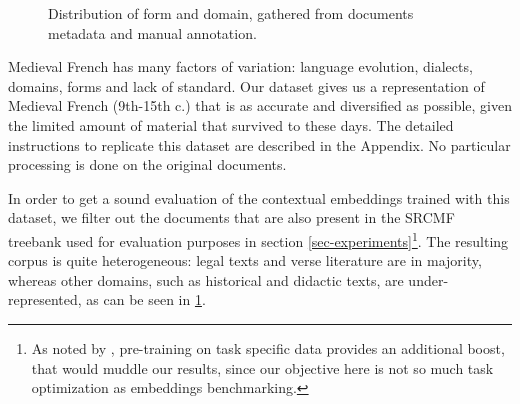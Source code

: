 \begin{figure}[thb]
    \centering
    \caption{Distribution of form and domain, gathered from documents metadata and manual annotation.}
    \label{fig:metadata}
\end{figure}

Medieval French has many factors of variation: language evolution, dialects, domains, forms and lack of standard. Our dataset gives us a representation of Medieval French (9th-15th c.) that is as accurate and diversified as possible, given the limited amount of material that survived to these days. The detailed instructions to replicate this dataset are described in the Appendix. No particular processing is done on the original documents.

In order to get a sound evaluation of the contextual embeddings trained with this dataset, we filter out the documents that are also present in the SRCMF treebank used for evaluation purposes in section \ref{sec-experiments}\footnote{As noted by \citet{gururangan-etal-2020-dont}, pre-training on task specific data provides an additional boost, that would muddle our results, since our objective here is not so much task optimization as embeddings benchmarking.}.
The resulting corpus is quite heterogeneous: legal texts and verse literature are in majority, whereas other domains, such as historical and didactic texts, are under-represented, as can be seen in \cref{fig:metadata}.

